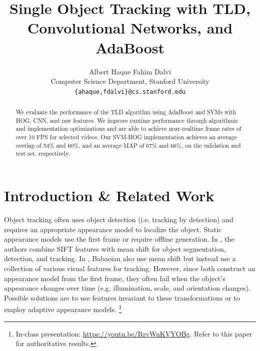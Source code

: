 \documentclass[10pt,twocolumn,letterpaper]{article}
\newcommand\blfootnote[1]{%
  \begingroup
  \renewcommand\thefootnote{}\footnote{#1}%
  \addtocounter{footnote}{-1}%
  \endgroup
}
\begin{document}
\title{Single Object Tracking with TLD, Convolutional Networks, and AdaBoost}

\author{Albert Haque \qquad Fahim Dalvi\\
Computer Science Department, Stanford University \\
{\tt\small \{ahaque,fdalvi\}@cs.stanford.edu}
}

\maketitle

\begin{abstract}
\vspace{-2mm}
   We evaluate the performance of the TLD algorithm using AdaBoost and SVMs with HOG, CNN, and raw features. We improve runtime performance through algorithmic and implementation optimizations and are able to achieve near-realtime frame rates of over 10 FPS for selected videos. Our SVM-HOG implementation achieves an average overlap of 54\% and 60\%, and an average MAP of 67\% and 66\%, on the validation and test set, respectively.
   \vspace{-2mm}
\end{abstract}

\section{Introduction \& Related Work}


Object tracking often uses object detection (i.e. tracking by detection) and requires an appropriate appearance model to localize the object. Static appearance models use the first frame or require offline generation. In \cite{zhou2009object}, the authors combine SIFT features with mean shift \cite{comaniciu2002mean} for object segmentation, detection, and tracking. In \cite{babaeian2009mean}, Babaeian \etal also use mean shift but instead use a collection of various visual features for tracking. However, since both \cite{zhou2009object,babaeian2009mean} construct an appearance model from the first frame, they often fail when the object's appearance changes over time (e.g. illumination, scale, and orientation changes). Possible solutions are to use features invariant to these transformations or to employ adaptive appearance models.
\blfootnote{In-class presentation: \url{https://youtu.be/RrvWuKVYOBg}. Refer to this paper for authoritative results.} 
\end{document}
